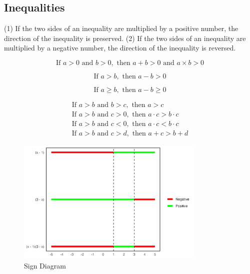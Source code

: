 \documentclass{article}
\begin{document}
\subsection{Inequalities}

(1) If the two sides of an inequality are multiplied by a positive number, the direction of the inequality is preserved.
(2) If the two sides of an inequality are multiplied by a negative number, the direction of the inequality is reversed.

\begin{equation}
 \text{If } a > 0 \text{ and } b > 0, \text{ then } a + b > 0 \text{ and } a \times b > 0
\end{equation}

\begin{equation}
 \text{If } a > b, \text{ then } a - b > 0
\end{equation}

\begin{equation}
 \text{If } a \geq b, \text{ then } a - b \geq 0
\end{equation}

\begin{align}
 \text{If } a > b \text{ and } b > c, \text{ then } a > c \\
 \text{If } a > b \text{ and } c > 0, \text{ then } a \cdot c > b \cdot c \\
 \text{If } a > b \text{ and } c < 0, \text{ then } a \cdot c < b \cdot c \\
 \text{If } a > b \text{ and } c > d, \text{ then } a + c > b + d
\end{align}

\begin{figure}[h]
\centering
\includegraphics[width=0.8\textwidth]{Sign_Diagram.png}
\caption{Sign Diagram}
\end{figure}
\end{document}
